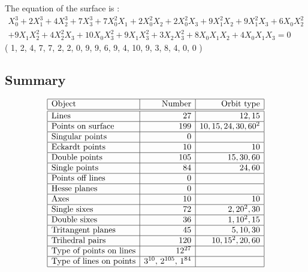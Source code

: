 The equation of the surface  is :
{\renewcommand{\arraystretch}{1.5}
$$
\begin{array}{c}
X_{0}^3 + 2X_{1}^3 + 4X_{2}^3 + 7X_{3}^3 + 7X_{0}^2X_{1} + 2X_{0}^2X_{2} + 2X_{0}^2X_{3} + 9X_{1}^2X_{2} + 9X_{1}^2X_{3} + 6X_{0}X_{2}^2\\
 + 9X_{1}X_{2}^2 + 4X_{2}^2X_{3} + 10X_{0}X_{3}^2 + 9X_{1}X_{3}^2 + 3X_{2}X_{3}^2 + 8X_{0}X_{1}X_{2} + 4X_{0}X_{1}X_{3}=0
\end{array}
$$}
( 1, 2, 4, 7, 7, 2, 2, 0, 9, 9, 6, 9, 4, 10, 9, 3, 8, 4, 0, 0 )\\
\subsection*{Summary}
{\renewcommand{\arraystretch}{1.5}
$$
\begin{array}{|l|r|r|}
\hline
\mbox{Object} & \mbox{Number}  & \mbox{Orbit type} \\\hline
\hline
\mbox{Lines} & 27 & 12, 15\\
\hline
\mbox{Points on surface} & 199 & 10, 15, 24, 30, 60^2\\
\hline
\mbox{Singular points} & 0 & \\
\hline
\mbox{Eckardt points} & 10 & 10\\
\hline
\mbox{Double points} & 105 & 15, 30, 60\\
\hline
\mbox{Single points} & 84 & 24, 60\\
\hline
\mbox{Points off lines} & 0 & \\
\hline
\mbox{Hesse planes} & 0 & \\
\hline
\mbox{Axes} & 10 & 10\\
\hline
\mbox{Single sixes} & 72 & 2, 20^2, 30\\
\hline
\mbox{Double sixes} & 36 & 1, 10^2, 15\\
\hline
\mbox{Tritangent planes} & 45 & 5, 10, 30\\
\hline
\mbox{Trihedral pairs} & 120 & 10, 15^2, 20, 60\\
\hline
\mbox{Type of points on lines} & 12^{27} & \\
\hline
\mbox{Type of lines on points} & 3^{10},\,2^{105},\,1^{84} & \\
\hline
\end{array}
$$}
